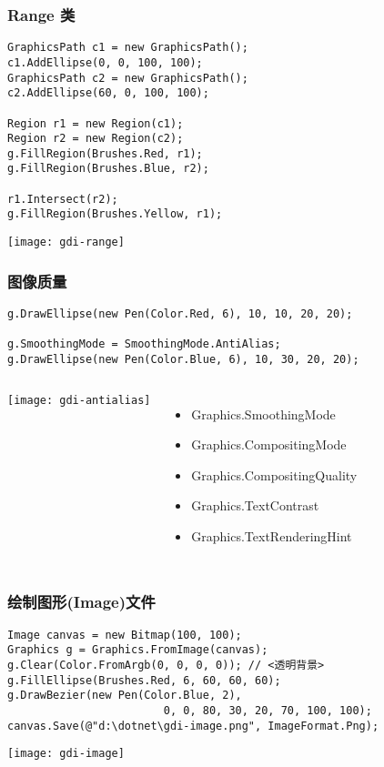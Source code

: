 \begin{frame}[fragile]
\frametitle{Range 类}
\begin{lstlisting}
GraphicsPath c1 = new GraphicsPath();
c1.AddEllipse(0, 0, 100, 100);
GraphicsPath c2 = new GraphicsPath();
c2.AddEllipse(60, 0, 100, 100);

Region r1 = new Region(c1);
Region r2 = new Region(c2);
g.FillRegion(Brushes.Red, r1);
g.FillRegion(Brushes.Blue, r2);

r1.Intersect(r2);
g.FillRegion(Brushes.Yellow, r1);
\end{lstlisting}
\centering \texttt{[image: gdi-range]}
\end{frame}


\begin{frame}[fragile]
\frametitle{图像质量}
\begin{lstlisting}
g.DrawEllipse(new Pen(Color.Red, 6), 10, 10, 20, 20);

g.SmoothingMode = SmoothingMode.AntiAlias;
g.DrawEllipse(new Pen(Color.Blue, 6), 10, 30, 20, 20);
\end{lstlisting}
  \begin{columns}
\centering   \texttt{[image: gdi-antialias]}
\begin{itemize}
\item Graphics.SmoothingMode
\item Graphics.CompositingMode
\item Graphics.CompositingQuality
\item Graphics.TextContrast
\item Graphics.TextRenderingHint
\end{itemize}
  \end{columns}
\end{frame}

\begin{frame}[fragile]
\frametitle{绘制图形(Image)文件}
\begin{lstlisting}[escapeinside=<>]
Image canvas = new Bitmap(100, 100);
Graphics g = Graphics.FromImage(canvas);
g.Clear(Color.FromArgb(0, 0, 0, 0)); // <透明背景>
g.FillEllipse(Brushes.Red, 6, 60, 60, 60);
g.DrawBezier(new Pen(Color.Blue, 2),
                        0, 0, 80, 30, 20, 70, 100, 100);
canvas.Save(@"d:\dotnet\gdi-image.png", ImageFormat.Png);
\end{lstlisting}
\centering \texttt{[image: gdi-image]}
\end{frame}



